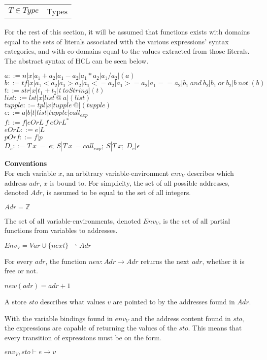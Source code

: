 {\begin{center}
\begin{table}[ht]
\begin{tabular}{ll}
			$T \in Type$          & Types
		\end{tabular}
	\end{table}
\end{center}

For the rest of this section, it will be assumed that functions exists with domains equal to the sets of literals associated with the various expressions' syntax categories, and with co-domains equal to the values extracted from those literals.
The abstract syntax of HCL can be seen below.

$a ::= n | x | a_1+a_2 | a_1-a_2 | a_1*a_2 | a_1/a_2 | (a)$\\
$b ::= tf| x | a_1<a_2 | a_1>a_2 | a_1<=a_2| a_1>=a_2| a_1==a_2 | b_1\ and\ b_2 | b_1\ or\ b_2 | b\ not | (b)$\\
$t ::= str| x | t_1 + t_2 | t\ toString | (t)$\\
$list ::= lst | x | list\ @\ a | (list)$\\
$tupple ::= tpl | x | tupple\ @ | (tupple)$\\
$e ::= a | b | t | list | tupple | call_{exp}$\\
$f ::= f | eOrL\ f\ eOrL^*$\\
$eOrL ::= e | L$\\
$pOrf ::= f | p$\\
$D_v ::= T\ x\ =\ e;\ S | T\ x\ = call_{exp};\ S | T\ x;\ D_v | \epsilon$

\textbf{\large{Conventions}} \\
For each variable $x$, an arbitrary variable-environment $env_V$ describes which address $adr$, $x$ is bound to.
For simplicity, the set of all possible addresses, denoted $Adr$, is assumed to be equal to the set of all integers.
\begin{center}
	$Adr = \mathbb{Z}$
\end{center}
The set of all variable-environments, denoted \textbf{$Env_V$}, is the set of all partial functions from variables to addresses.
\begin{center}
	$Env_V = Var \cup \{next\} \rightharpoonup Adr$
\end{center}
For every $adr$, the function $new : Adr \rightarrow Adr$ returns the next $adr$, whether it is free or not.
\begin{center}
	$new (adr) = adr + 1$
\end{center}
A store $sto$ describes what values $v$ are pointed to by the addresses found in $Adr$.

With the variable bindings found in $env_V$ and the address content found in $sto$, the expressions are capable of returning the values of the $sto$.
This means that every transition of expressions must be on the form.
\begin{center}
	$env_V,sto \vdash e \rightarrow v$
\end{center} 

}
